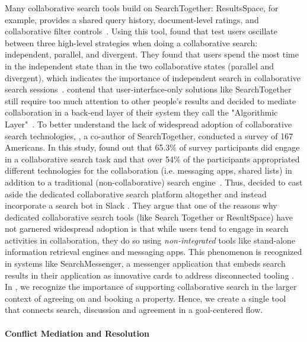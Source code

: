 Many collaborative search tools build on SearchTogether:
ResultsSpace, for example, provides a shared query history, document-level ratings, and collaborative filter controls~\cite{resultsspace}. Using this tool,  \citeauthor{resultsspace} found that test users oscillate between three high-level strategies when doing a collaborative search: independent, parallel, and divergent. They found that users spend the most time in the independent state than in the two collaborative states (parallel and divergent), which indicates the importance of independent search in collaborative search sessions~\cite{resultsspace}. \citeauthor{algorithmiccollaborativesearch} contend that user-interface-only solutions like SearchTogether still require too much attention to other people's results and decided to mediate collaboration in a back-end layer of their system they call the "Algorithmic Layer"~\cite{algorithmiccollaborativesearch}. 
To better understand the lack of widespread adoption of collaborative search technologies, \citeauthor{collaborativesearchrevisted}, a co-author of SearchTogether, conducted a survey of 167 Americans. 
In this study, \citeauthor{collaborativesearchrevisted} found out that 65.3\% of survey participants did engage in a collaborative search task and that over 54\% of the participants appropriated different technologies for the collaboration (i.e. messaging apps, shared lists) in addition to a traditional (non-collaborative) search engine~\cite{collaborativesearchrevisted}. 
Thus, \citeauthor{slacksearch} decided to cast aside the dedicated collaborative search platform altogether and instead incorporate a search bot in Slack \cite{slacksearch}. They argue that one of the reasons why dedicated collaborative search tools  (like Search Together or ResultSpace) have not garnered widespread adoption is that while users tend to engage in search activities in collaboration, they do so using \textit{non-integrated} tools like stand-alone information retrieval engines and messaging apps. This phenomenon is recognized in systems like SearchMessenger, a messenger application that embeds search results in their application as innovative cards to address disconnected tooling \cite{searchcard}. In \tool, we recognize the importance of supporting collaborative search in the larger context of agreeing on and booking a property. Hence, we create a single tool that connects search, discussion and agreement in a goal-centered flow.


\paragraph{Conflict Mediation and Resolution}

